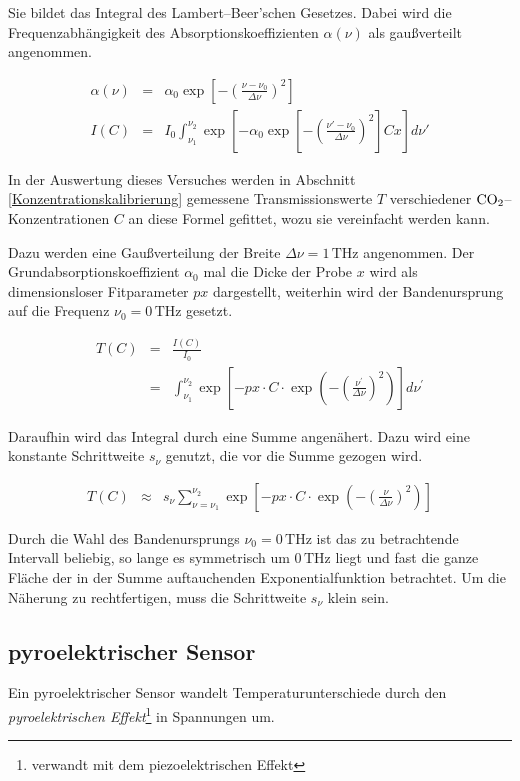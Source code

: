 \documentclass[12pt,a4paper]{scrartcl}
\numberwithin{equation}{section} %
\begin{document}
Sie bildet das Integral des Lambert--Beer'schen Gesetzes. Dabei wird die Frequenzabhängigkeit des Absorptionskoeffizienten $\alpha(\nu)$ als gaußverteilt angenommen.

\begin{eqnarray}
	\alpha(\nu) &=& \alpha_0 \exp[- \left(\frac{\nu - \nu_0}{\Delta \nu}\right)^2] \\
	I(C) &=& I_0 \int_{\nu_1}^{\nu_2} \exp[-\alpha_0 \exp \left[- \left(\frac{\nu' - \nu_0}{\Delta \nu}\right)^2\right] C x] d\nu' \label{eq:Lambert-Beer-Gauß}
\end{eqnarray}

\noindent
In der Auswertung dieses Versuches werden in Abschnitt \ref{Konzentrationskalibrierung} gemessene Transmissionswerte $T$ verschiedener $\ce{CO_2}$--Konzentrationen $C$ an diese Formel gefittet, wozu sie vereinfacht werden kann.

Dazu werden eine Gaußverteilung der Breite $\Delta \nu=1\mathrm{\,THz}$ angenommen. Der Grundabsorptionskoeffizient $\alpha_0$ mal die Dicke der Probe $x$ wird als dimensionsloser Fitparameter $px$ dargestellt, weiterhin wird der Bandenursprung auf die Frequenz $\nu_0=0\mathrm{\,THz}$ gesetzt.

\begin{eqnarray}
	T(C) &=& \frac{I(C)}{I_0} \\
		&=& \int_{\nu_1}^{\nu_2} \exp[- px \cdot C \cdot \exp(- \left(\frac{\nu^{\prime}}{\Delta \nu}\right)^2)] d\nu^\prime
\end{eqnarray}

\noindent
Daraufhin wird das Integral durch eine Summe angenähert. Dazu wird eine konstante Schrittweite $s_\nu$ genutzt, die vor die Summe gezogen wird.

\begin{eqnarray}
	T(C) &\approx& s_\nu \sum_{\nu = \nu_1}^{\nu_2} \exp[- px \cdot C \cdot \exp(-\left(\frac{\nu}{\Delta \nu}\right)^2)]
		\label{eq:Lambert-Beer-Gauß_vereinfacht}
\end{eqnarray}

\noindent
Durch die Wahl des Bandenursprungs $\nu_0=0\mathrm{\,THz}$ ist das zu betrachtende Intervall beliebig, so lange es symmetrisch um $0\mathrm{\,THz}$ liegt und fast die ganze Fläche der in der Summe auftauchenden Exponentialfunktion betrachtet. Um die Näherung zu rechtfertigen, muss die Schrittweite $s_\nu$ klein sein.

\subsection{pyroelektrischer Sensor}
Ein pyroelektrischer Sensor wandelt Temperaturunterschiede durch den \emph{pyroelektrischen Effekt}\footnote{verwandt mit dem piezoelektrischen Effekt} in Spannungen um.
\end{document}
